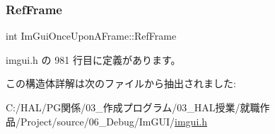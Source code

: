 \subsubsection{\texorpdfstring{Ref\+Frame}{RefFrame}}
{\footnotesize\ttfamily int Im\+Gui\+Once\+Upon\+A\+Frame\+::\+Ref\+Frame\hspace{0.3cm}{\ttfamily [mutable]}}



 imgui.\+h の 981 行目に定義があります。



この構造体詳解は次のファイルから抽出されました\+:\begin{DoxyCompactItemize}
\item 
C\+:/\+H\+A\+L/\+P\+G関係/03\+\_\+作成プログラム/03\+\_\+\+H\+A\+L授業/就職作品/\+Project/source/06\+\_\+\+Debug/\+Im\+G\+U\+I/\mbox{\hyperlink{imgui_8h}{imgui.\+h}}\end{DoxyCompactItemize}
